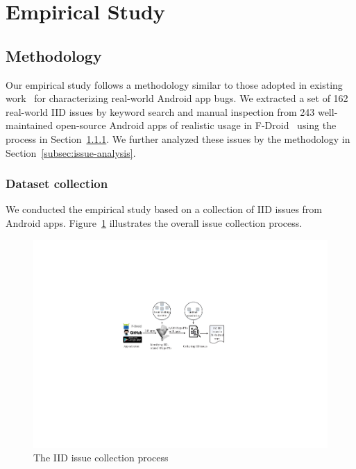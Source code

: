 \section{Empirical Study}\label{sec:study}

\subsection{Methodology}

Our empirical study follows a methodology similar to those adopted in existing work~\cite{liu2016understanding, hu2018tale} for characterizing real-world Android app bugs.
We extracted a set of 162 real-world IID issues by keyword search and manual inspection from 243 well-maintained open-source Android apps of realistic usage in F-Droid~\cite{f-droid} using the process in Section~\ref{subsec:dataset-collection}. We further analyzed these issues by the methodology in Section~\ref{subsec:issue-analysis}.

\subsubsection{Dataset collection} \label{subsec:dataset-collection}

We conducted the empirical study based on a collection of IID issues from Android apps. Figure~\ref{fig:issue_collection} illustrates the overall issue collection process.

\begin{figure}[ht]
  \centering
  \includegraphics[scale=0.8]{pictures/fig1}
  \caption{The IID issue collection process}
  \label{fig:issue_collection}
\end{figure}


